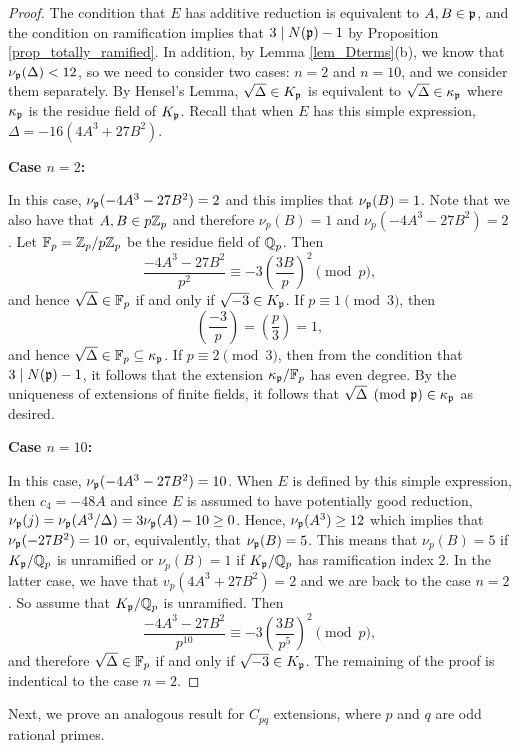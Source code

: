 \begin{proof}
    The condition that $E$ has additive reduction is equivalent to $A,B\in\mathfrak{p}$, and the condition on ramification implies that $3\mid N(\mathfrak{p})-1$ by Proposition \ref{prop_totally_ramified}. In addition, by Lemma \ref{lem_Dterms}(b), we know that $\nu_{\mathfrak{p}}(\Delta)<12$, so we need to consider two cases: $n=2$ and $n=10$, and we consider them separately. By Hensel's Lemma, $\sqrt{\Delta}\in K_{\mathfrak{p}}$ is equivalent to $\sqrt{\Delta}\in \kappa_{\mathfrak{p}}$ where $\kappa_{\mathfrak{p}}$ is the residue field of $K_{\mathfrak{p}}$. Recall that when $E$ has this simple expression, $\Delta=-16(4A^3+27B^2)$.


    \textbf{Case $n=2$:}

    In this case, $\nu_{\mathfrak{p}}(-4A^3-27B^2)=2$ and this implies that $\nu_{\mathfrak{p}}(B)=1$. Note that we also have that $A,B\in p\mathbb{Z}_p$ and therefore $\nu_p(B)=1$ and $\nu_p(-4A^3-27B^2)=2$. Let $\mathbb{F}_p=\mathbb{Z}_p/p\mathbb{Z}_p$ be the residue field of $\mathbb{Q}_p$. Then 
    $$\frac{-4A^3-27B^2}{p^2}\equiv -3\left(\frac{3B}{p}\right)^2\pmod{p},$$
    and hence $\sqrt{\Delta}\in\mathbb{F}_p$ if and only if $\sqrt{-3}\in K_{\mathfrak{p}}$. 
    If $p\equiv1\pmod{3}$, then
    $$\left(\frac{-3}{p}\right)=\left(\frac{p}{3}\right)=1,$$
    and hence $\sqrt{\Delta}\in \mathbb{F}_p\subseteq \kappa_{\mathfrak{p}}$. If $p\equiv 2\pmod{3}$, then from the condition that $3\mid N(\mathfrak{p})-1$, it follows that the extension $\kappa_{\mathfrak{p}}/\mathbb{F}_p$ has even degree. By the uniqueness of extensions of finite fields, it follows that $\sqrt{\Delta}\pmod{\mathfrak{p}}\in\kappa_{\mathfrak{p}}$ as desired.

    \textbf{Case $n=10$:} 

    In this case, $\nu_{\mathfrak{p}}(-4A^3-27B^2)=10$. When $E$ is defined by this simple expression, then $c_4=-48A$ and since $E$ is assumed to have potentially good reduction, $\nu_{\mathfrak{p}}(j)=\nu_{\mathfrak{p}}(A^3/\Delta)=3\nu_{\mathfrak{p}}(A)-10\geq 0$. Hence, $\nu_{\mathfrak{p}}(A^3)\geq12$ which implies that $\nu_{\mathfrak{p}}(-27B^2)=10$ or, equivalently, that $\nu_{\mathfrak{p}}(B)=5$. This means that $\nu_p(B)=5$ if $K_{\mathfrak{p}}/\mathbb{Q}_p$ is unramified or $\nu_p(B)=1$ if $K_{\mathfrak{p}}/\mathbb{Q}_p$ has ramification index $2$. In the latter case, we have that $v_p(4A^3+27B^2)=2$ and we are back to the case $n=2$. So assume that $K_{\mathfrak{p}}/\mathbb{Q}_p$ is unramified. Then
    $$\frac{-4A^3-27B^2}{p^{10}}\equiv -3\left(\frac{3B}{p^5}\right)^2\pmod{p},$$
    and therefore $\sqrt{\Delta}\in\mathbb{F}_p$ if and only if $\sqrt{-3}\in K_{\mathfrak{p}}$. The remaining of the proof is indentical to the case $n=2$.

\end{proof}

Next, we prove an analogous result for $C_{pq}$ extensions, where $p$ and $q$ are odd rational primes.

